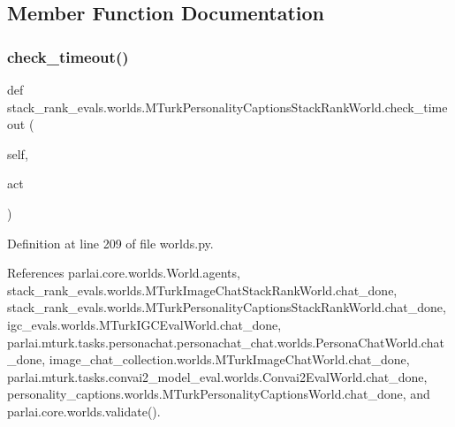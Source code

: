 \subsection{Member Function Documentation}
\mbox{\label{classstack__rank__evals_1_1worlds_1_1MTurkPersonalityCaptionsStackRankWorld_a60ac9e09fd5c55d81fafc0a86794716b}} 
\subsubsection{\texorpdfstring{check\+\_\+timeout()}{check\_timeout()}}
{\footnotesize\ttfamily def stack\+\_\+rank\+\_\+evals.\+worlds.\+M\+Turk\+Personality\+Captions\+Stack\+Rank\+World.\+check\+\_\+timeout (\begin{DoxyParamCaption}\item[{}]{self,  }\item[{}]{act }\end{DoxyParamCaption})}



Definition at line 209 of file worlds.\+py.



References parlai.\+core.\+worlds.\+World.\+agents, stack\+\_\+rank\+\_\+evals.\+worlds.\+M\+Turk\+Image\+Chat\+Stack\+Rank\+World.\+chat\+\_\+done, stack\+\_\+rank\+\_\+evals.\+worlds.\+M\+Turk\+Personality\+Captions\+Stack\+Rank\+World.\+chat\+\_\+done, igc\+\_\+evals.\+worlds.\+M\+Turk\+I\+G\+C\+Eval\+World.\+chat\+\_\+done, parlai.\+mturk.\+tasks.\+personachat.\+personachat\+\_\+chat.\+worlds.\+Persona\+Chat\+World.\+chat\+\_\+done, image\+\_\+chat\+\_\+collection.\+worlds.\+M\+Turk\+Image\+Chat\+World.\+chat\+\_\+done, parlai.\+mturk.\+tasks.\+convai2\+\_\+model\+\_\+eval.\+worlds.\+Convai2\+Eval\+World.\+chat\+\_\+done, personality\+\_\+captions.\+worlds.\+M\+Turk\+Personality\+Captions\+World.\+chat\+\_\+done, and parlai.\+core.\+worlds.\+validate().



